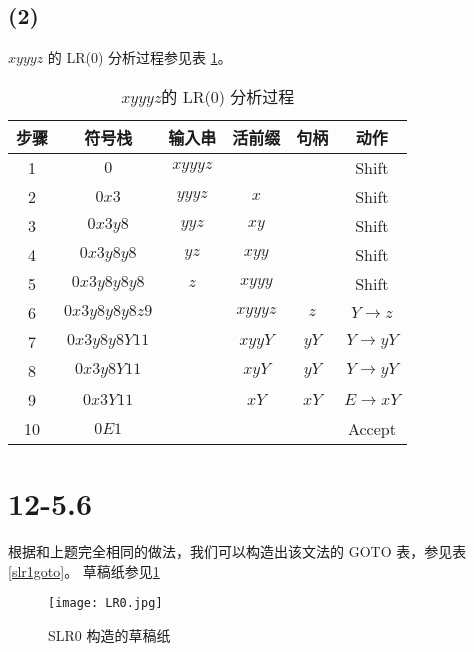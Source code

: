 \documentclass[UTF8]{ctexart}
\begin{document}
    \subsection*{(2)}
        $xyyyz$ 的 LR(0) 分析过程参见表 \ref{xyyyz}。
        \begin{table}[htbp!]
            \centering
            \begin{tabular}{|c|c|c|c|c|c|}
                \hline
                步骤 & 符号栈 & 输入串 & 活前缀 & 句柄 & 动作 \\
                \hline
                1 & $0$ & $xyyyz$ &  &  & Shift \\
                \hline
                2 & $0x3$ & $yyyz$ & $x$ &  & Shift \\
                \hline
                3 & $0x3y8$ & $yyz$ & $xy$ &  & Shift \\
                \hline
                4 & $0x3y8y8$ & $yz$ & $xyy$ &  & Shift \\
                \hline
                5 & $0x3y8y8y8$ & $z$ & $xyyy$ &  & Shift \\
                \hline
                6 & $0x3y8y8y8z9$ &  & $xyyyz$ & $z$ & $Y\to z$ \\
                \hline
                7 & $0x3y8y8Y11$ &  & $xyyY$ & $yY$ & $Y\to yY$ \\
                \hline
                8 & $0x3y8Y11$ &  & $xyY$ & $yY$ & $Y\to yY$ \\
                \hline
                9 & $0x3Y11$ &  & $xY$ & $xY$ & $E\to xY$ \\
                \hline
                10 & $0E1$ &  &  &  & Accept \\
                \hline
                
            \end{tabular}
            \caption{$xyyyz$的 LR(0) 分析过程}
            \label{xyyyz}
        \end{table}

\section*{12-5.6}
    根据和上题完全相同的做法，我们可以构造出该文法的 GOTO 表，参见表\ref{slr1goto}。
    草稿纸参见\ref{slr0}
    \begin{figure}[htbp!]
        \centering
        \texttt{[image: LR0.jpg]}
        \caption{SLR0 构造的草稿纸}
        \label{slr0}
    \end{figure}
\end{document}
